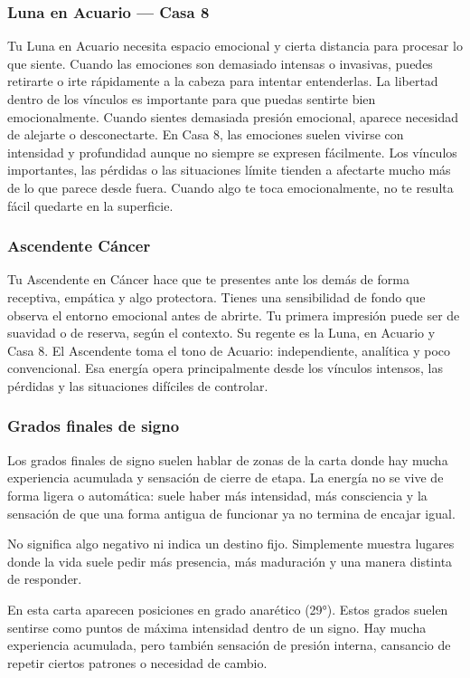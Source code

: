 \documentclass[11pt,a4paper]{article}\usepackage[utf8]{inputenc}
\begin{document}
\subsubsection*{Luna en Acuario — Casa 8}
Tu Luna en Acuario necesita espacio emocional y cierta distancia para procesar lo que siente. Cuando las emociones son demasiado intensas o invasivas, puedes retirarte o irte rápidamente a la cabeza para intentar entenderlas. La libertad dentro de los vínculos es importante para que puedas sentirte bien emocionalmente. Cuando sientes demasiada presión emocional, aparece necesidad de alejarte o desconectarte. En Casa 8, las emociones suelen vivirse con intensidad y profundidad aunque no siempre se expresen fácilmente. Los vínculos importantes, las pérdidas o las situaciones límite tienden a afectarte mucho más de lo que parece desde fuera. Cuando algo te toca emocionalmente, no te resulta fácil quedarte en la superficie.

\subsubsection*{Ascendente Cáncer}
Tu Ascendente en Cáncer hace que te presentes ante los demás de forma receptiva, empática y algo protectora. Tienes una sensibilidad de fondo que observa el entorno emocional antes de abrirte. Tu primera impresión puede ser de suavidad o de reserva, según el contexto. Su regente es la Luna, en Acuario y Casa 8. El Ascendente toma el tono de Acuario: independiente, analítica y poco convencional. Esa energía opera principalmente desde los vínculos intensos, las pérdidas y las situaciones difíciles de controlar.

\subsubsection*{Grados finales de signo}
Los grados finales de signo suelen hablar de zonas de la carta donde hay mucha experiencia acumulada y sensación de       cierre de etapa. La energía no se vive de forma ligera o automática: suele haber más intensidad, más consciencia y la sensación de que una forma antigua de funcionar ya no termina de encajar igual.

No significa algo negativo ni indica un destino fijo. Simplemente muestra lugares donde la vida suele pedir más presencia, más maduración y una manera distinta de responder.

En esta carta aparecen posiciones en grado anarético (29°). Estos grados suelen sentirse como puntos de máxima intensidad dentro de un signo. Hay mucha experiencia acumulada, pero también sensación de presión interna, cansancio de repetir ciertos patrones o necesidad de cambio.
\end{document}
